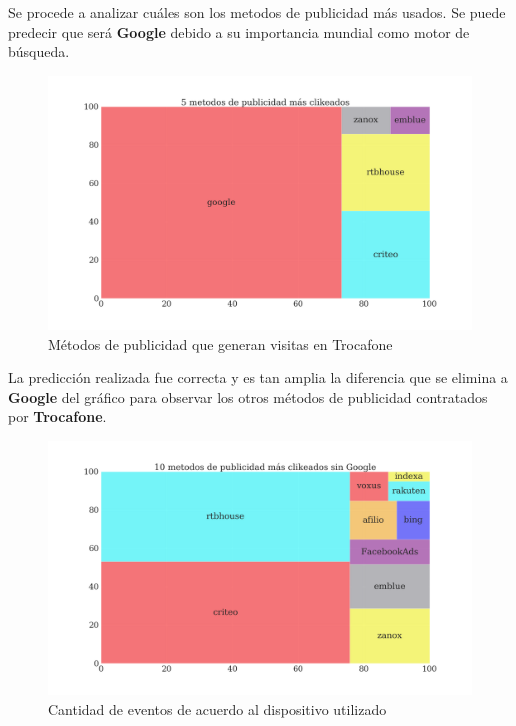 \documentclass[a4paper]{article}
\begin{document}
Se procede a analizar cuáles son los metodos de publicidad más usados. Se puede predecir que será \textbf{Google} debido a su importancia mundial como motor de búsqueda.

\begin{figure}[h!]
	\includegraphics[width=\linewidth]{figures/170-publicidad_clickeada-barplot.png}
	\caption{Métodos de publicidad que generan visitas en Trocafone}
	\label{fig:metodopublicidad}
\end{figure}

La predicción realizada fue correcta y es tan amplia la diferencia que se elimina a \textbf{Google} del gráfico para observar los otros métodos de publicidad contratados por \textbf{Trocafone}.

\begin{figure}[h!]
	\includegraphics[width=\linewidth]{figures/171-publicidad_sin_google-barplot.png}
	\caption{Cantidad de eventos de acuerdo al dispositivo utilizado}
	\label{fig:metodopublicidadsingoogle}
\end{figure}
\end{document}
